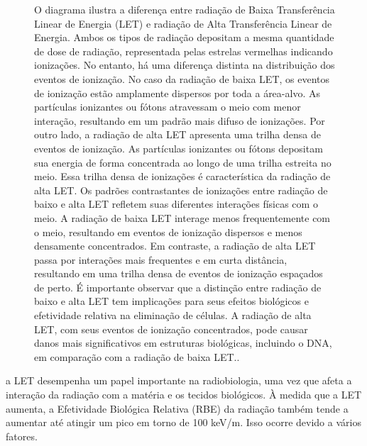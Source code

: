 \documentclass[11pt,a4paper]{article}
\begin{document}
	\begin{figure}[!h]
		\centering
		\caption{O diagrama ilustra a diferença entre radiação de Baixa Transferência Linear de Energia (LET) e radiação de Alta Transferência Linear de Energia. Ambos os tipos de radiação depositam a mesma quantidade de dose de radiação, representada pelas estrelas vermelhas indicando ionizações. No entanto, há uma diferença distinta na distribuição dos eventos de ionização. No caso da radiação de baixa LET, os eventos de ionização estão amplamente dispersos por toda a área-alvo. As partículas ionizantes ou fótons atravessam o meio com menor interação, resultando em um padrão mais difuso de ionizações. Por outro lado, a radiação de alta LET apresenta uma trilha densa de eventos de ionização. As partículas ionizantes ou fótons depositam sua energia de forma concentrada ao longo de uma trilha estreita no meio. Essa trilha densa de ionizações é característica da radiação de alta LET. Os padrões contrastantes de ionizações entre radiação de baixo e alta LET refletem suas diferentes interações físicas com o meio. A radiação de baixa LET interage menos frequentemente com o meio, resultando em eventos de ionização dispersos e menos densamente concentrados. Em contraste, a radiação de alta LET passa por interações mais frequentes e em curta distância, resultando em uma trilha densa de eventos de ionização espaçados de perto. É importante observar que a distinção entre radiação de baixo e alta LET tem implicações para seus efeitos biológicos e efetividade relativa na eliminação de células. A radiação de alta LET, com seus eventos de ionização concentrados, pode causar danos mais significativos em estruturas biológicas, incluindo o DNA, em comparação com a radiação de baixa LET..}
		\label{fig:efeitoLetAltaEBaixe}
	\end{figure}

	a LET desempenha um papel importante na radiobiologia, uma vez que afeta a interação da radiação com a matéria e os tecidos biológicos. À medida que a LET aumenta, a Efetividade Biológica Relativa (RBE) da radiação também tende a aumentar até atingir um pico em torno de 100 keV/\mu m. Isso ocorre devido a vários fatores.
\end{document}
